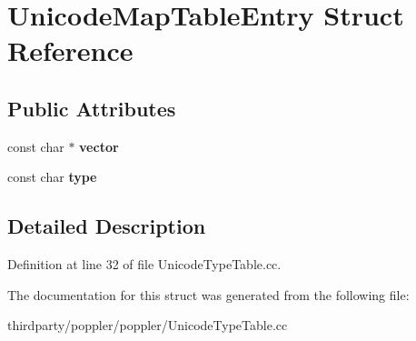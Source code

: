 \hypertarget{struct_unicode_map_table_entry}{}\section{Unicode\+Map\+Table\+Entry Struct Reference}
\label{struct_unicode_map_table_entry}
\subsection*{Public Attributes}
\begin{DoxyCompactItemize}
\item 
\mbox{\label{struct_unicode_map_table_entry_a27ae45c91d926fbd751cf49a305b8803}} 
const char $\ast$ {\bfseries vector}
\item 
\mbox{\label{struct_unicode_map_table_entry_a4899b6f8220a17418662dd62b70469b9}} 
const char {\bfseries type}
\end{DoxyCompactItemize}


\subsection{Detailed Description}


Definition at line 32 of file Unicode\+Type\+Table.\+cc.



The documentation for this struct was generated from the following file\+:\begin{DoxyCompactItemize}
\item 
thirdparty/poppler/poppler/Unicode\+Type\+Table.\+cc\end{DoxyCompactItemize}

